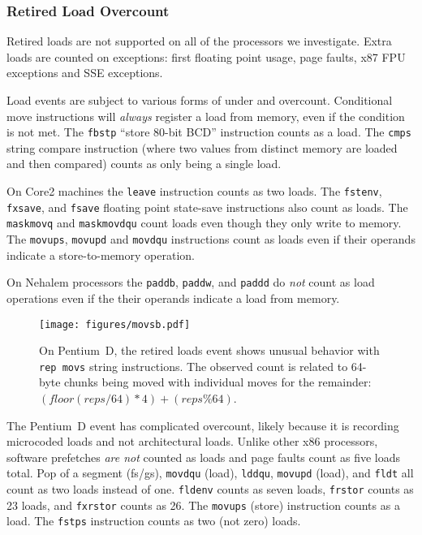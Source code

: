\subsubsection{Retired Load Overcount} 
Retired loads are not supported on all of the processors we investigate.
Extra loads are counted on exceptions: first floating point usage,
page faults, x87 FPU exceptions and SSE exceptions.

Load events are subject to various forms of under and overcount.
Conditional move instructions will {\em always} register a 
load from memory, even if the condition is not met.
The {\tt fbstp} ``store 80-bit BCD'' instruction counts as
a load.  The {\tt cmps} string compare instruction (where two values from 
distinct memory are loaded and then compared) counts as only being
a single load.

On Core2 machines the {\tt leave} instruction counts as two loads.
The {\tt fstenv}, {\tt fxsave},  and {\tt fsave} floating point
state-save instructions also count as loads.
The  {\tt maskmovq} and  {\tt maskmovdqu} count loads even though
they only write to memory.  The {\tt movups}, {\tt movupd} and 
{\tt movdqu} instructions count as loads even if their operands
indicate a store-to-memory operation.

On Nehalem processors the {\tt paddb}, {\tt paddw}, and {\tt paddd}
do {\em not} count as load operations even if the their operands
indicate a load from memory.

\begin{figure}[!t]
\centering
\texttt{[image: figures/movsb.pdf]}
\caption{On Pentium~D, the retired loads event shows unusual
       behavior with {\tt rep movs} string instructions.
       The observed count is related to 64-byte chunks being moved
       with individual moves for the remainder:
        $(floor(reps/64)*4)+(reps\%64)$.}
\label{figure:movsb}
\end{figure}

The Pentium~D event has complicated overcount, likely because
it is recording microcoded loads and not architectural loads.
Unlike other x86 processors, software
prefetches {\em are not} counted as loads and page faults 
count as five loads total.
Pop of a segment (fs/gs), {\tt movdqu} (load),
{\tt lddqu}, {\tt movupd} (load), and {\tt fldt} all count
as two loads instead of one. {\tt fldenv} counts as seven loads,
{\tt frstor} counts as 23 loads, and {\tt fxrstor} counts as 26.
The {\tt movups} (store) instruction counts as a load.
The {\tt fstps} instruction  counts as two (not zero) loads.

